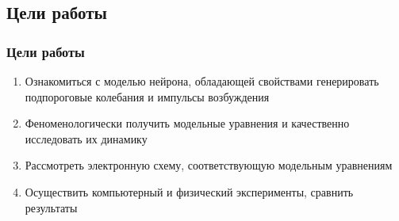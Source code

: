\subsection{Цели работы}
\begin{frame}[t]
	\frametitle{Цели работы}
	\vfill
	\begin{spacing}{1}
		\begin{enumerate}
			\item Ознакомиться с моделью нейрона, обладающей свойствами генерировать  подпороговые колебания и импульсы возбуждения
			\item Феноменологически получить модельные уравнения и качественно исследовать их динамику
			\item Рассмотреть электронную схему, соответствующую модельным уравнениям
			\item Осуществить компьютерный и физический эксперименты, сравнить результаты
		\end{enumerate}
	\end{spacing}
	\vfill
\end{frame}
